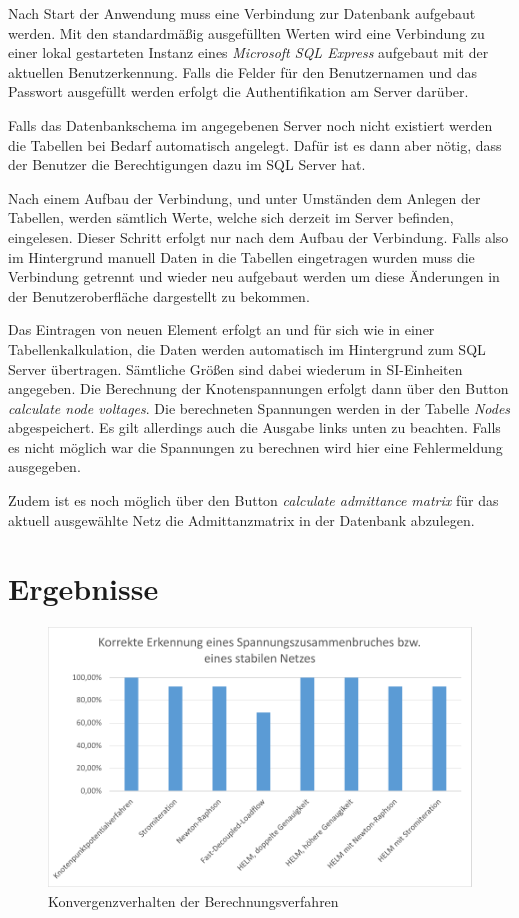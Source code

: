 \documentclass[12pt,a4paper]{article}
\begin{document}
	Nach Start der Anwendung muss eine Verbindung zur Datenbank aufgebaut werden. Mit den standardmäßig ausgefüllten Werten wird eine Verbindung zu einer lokal gestarteten Instanz eines \emph{Microsoft SQL Express} aufgebaut mit der aktuellen Benutzerkennung. Falls die Felder für den Benutzernamen und das Passwort ausgefüllt werden erfolgt die Authentifikation am Server darüber.
	
	Falls das Datenbankschema im angegebenen Server noch nicht existiert werden die Tabellen bei Bedarf automatisch angelegt. Dafür ist es dann aber nötig, dass der Benutzer die Berechtigungen dazu im SQL Server hat.
	
	Nach einem Aufbau der Verbindung, und unter Umständen dem Anlegen der Tabellen, werden sämtlich Werte, welche sich derzeit im Server befinden, eingelesen. Dieser Schritt erfolgt nur nach dem Aufbau der Verbindung. Falls also im Hintergrund manuell Daten in die Tabellen eingetragen wurden muss die Verbindung getrennt und wieder neu aufgebaut werden um diese Änderungen in der Benutzeroberfläche dargestellt zu bekommen.
	
	Das Eintragen von neuen Element erfolgt an und für sich wie in einer Tabellenkalkulation, die Daten werden automatisch im Hintergrund zum SQL Server übertragen. Sämtliche Größen sind dabei wiederum in SI-Ein\-hei\-ten angegeben. Die Berechnung der Knotenspannungen erfolgt dann über den Button \emph{calculate node voltages}. Die berechneten Spannungen werden in der Tabelle \emph{Nodes} abgespeichert. Es gilt allerdings auch die Ausgabe links unten zu beachten. Falls es nicht möglich war die Spannungen zu berechnen wird hier eine Fehlermeldung ausgegeben.
	
	Zudem ist es noch möglich über den Button \emph{calculate admittance matrix} für das aktuell ausgewählte Netz die Admittanzmatrix in der Datenbank abzulegen.
	
	\section{Ergebnisse}
	
	\begin{figure}
		\centering
		\includegraphics[scale=0.8]{pictures/convergence}
		\caption{Konvergenzverhalten der Berechnungsverfahren}
		\label{fig:convergence}
	\end{figure}
	
\end{document}
